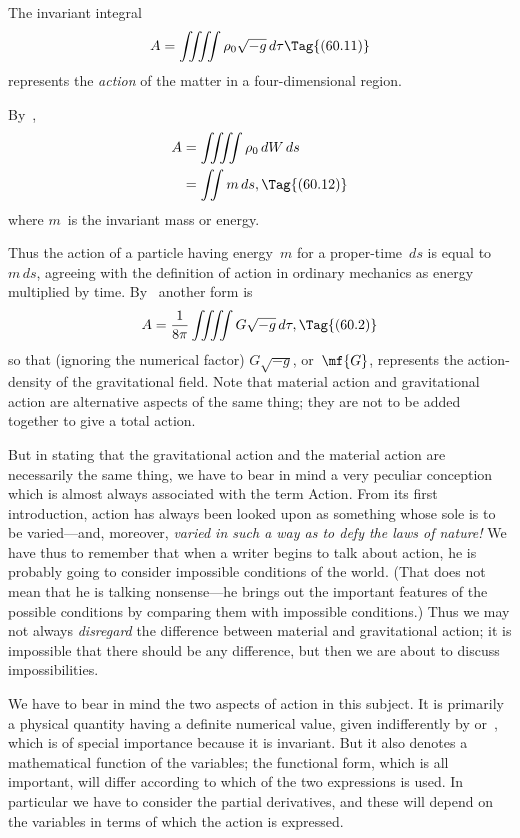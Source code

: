 \documentclass[12pt]{book}
\begin{document}

The invariant integral
\[
A = \iiiint \rho_{0} \sqrt{-g}\, d\tau
\Tag{(60.11)}
\]
represents the \emph{action} of the matter in a four-dimensional region.

By~,
\begin{align*}
  A &= \iiiint \rho_{0}\, dW\, ds \\
  &= \iint m\, ds,
  \Tag{(60.12)}
\end{align*}
where $m$~is the invariant mass or energy.

Thus the action of a particle having energy~$m$ for a proper-time~$ds$ is
equal to~$m\, ds$, agreeing with the definition of action in ordinary mechanics as
energy multiplied by time. By~ another form is
\[
A = \frac{1}{8\pi} \iiiint G\sqrt{-g}\, d\tau,
\Tag{(60.2)}
\]
so that (ignoring the numerical factor) $G\sqrt{-g}$, or~$\mf{G}$, represents the action-density
of the gravitational field. Note that material action and gravitational
action are alternative aspects of the same thing; they are not to be added
together to give a total action.

But in stating that the gravitational action and the material action are
necessarily the same thing, we have to bear in mind a very peculiar conception
which is almost always associated with the term Action. From its first introduction,
action has always been looked upon as something whose sole 
is to be varied---and, moreover, \emph{varied in such a way as to defy the laws
of nature!} We have thus to remember that when a writer begins to talk
about action, he is probably going to consider impossible conditions of the
world. (That does not mean that he is talking nonsense---he brings out the
important features of the possible conditions by comparing them with impossible
conditions.) Thus we may not always \emph{disregard} the difference between material
and gravitational action; it is impossible that there should be any difference,
but then we are about to discuss impossibilities.

We have to bear in mind the two aspects of action in this subject. It is
primarily a physical quantity having a definite numerical value, given indifferently
by  or~, which is of special importance because it is
invariant. But it also denotes a mathematical function of the variables; the
functional form, which is all important, will differ according to which of the
two expressions is used. In particular we have to consider the partial derivatives,
and these will depend on the variables in terms of which the action is
expressed.
\end{document}
